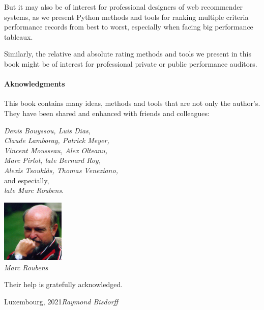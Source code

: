 But it may also be of interest for professional designers of web recommender systems, as we present Python methods and tools for ranking multiple criteria performance records from best to worst, especially when facing big performance tableaux.

Similarly, the relative and absolute rating methods and tools we present in this book might be of interest for professional private or public performance auditors. 

\paragraph{Aknowledgments}

This book contains many ideas, methods and tools that are not only the author’s. They have been shared and enhanced with friends and colleagues: 

\vspace{0.5cm}
\begin{minipage}{7cm}
\emph{Denis Bouyssou, Luis Dias,}\\ 
\emph{Claude Lamboray, Patrick Meyer,}\\
\emph{Vincent Mousseau, Alex Olteanu,}\\
\emph{Marc Pirlot, late Bernard Roy,}\\
\emph{Alexis Tsouki\`as, Thomas Veneziano,}\\
and especially,\\
\emph{late Marc Roubens}.
\end{minipage}\quad
\begin{minipage}{3cm}
\includegraphics[width=3cm]{Figures/Marc-Roubens.jpg} \\
{\tiny \emph{Marc Roubens}}
\end{minipage}

\vspace{0.3cm}
Their help is gratefully acknowledged.

\vspace{\baselineskip}
\begin{flushright}\noindent
Luxembourg, 2021\hfill {\it Raymond Bisdorff}\\
\end{flushright}


